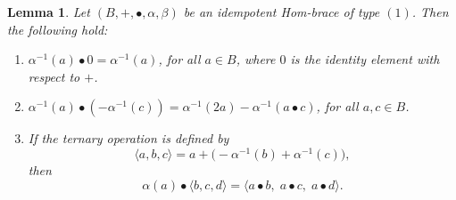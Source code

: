 \documentclass[14pt]{article}
\newtheorem{lemma}[thm]{Lemma}
\theoremstyle{Definition}
\theoremstyle{remark}
\begin{document}
\begin{lemma}
Let $(B,+,\bullet,\alpha,\beta)$ be an idempotent Hom-brace of type $(1)$. Then the following hold:
\begin{enumerate}
\item[(1)] $\alpha^{-1}(a)\bullet 0 = \alpha^{-1}(a)$, for all $a \in B$, where $0$ is the identity element with respect to $+$.
\item[(2)] $\alpha^{-1}(a)\bullet(-\alpha^{-1}(c)) = \alpha^{-1}(2a) - \alpha^{-1}(a\bullet c)$, for all $a,c \in B$.
\item[(3)] If the ternary operation is defined by 
\[
\langle a,b,c\rangle = a + \bigl(-\alpha^{-1}(b) + \alpha^{-1}(c)\bigr),
\]
then
\[
\alpha(a)\bullet \langle b,c,d\rangle = \langle a\bullet b,\; a\bullet c,\; a\bullet d\rangle.
\]
\end{enumerate}
\end{lemma}
\end{document}

